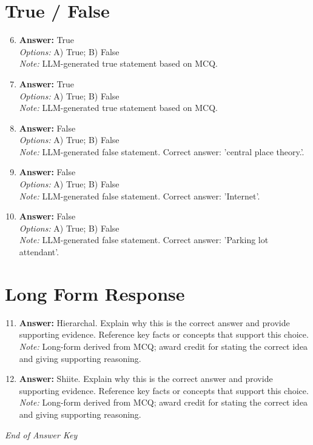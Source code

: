 \documentclass[12pt]{article}
\begin{document}
\section*{True / False}
\begin{enumerate}[label=\arabic*.]
\setcounter{enumi}{5}
\item \textbf{Answer:} True
\\ \textit{Options:} A) True; B) False
\\ \textit{Note:} LLM-generated true statement based on MCQ.
\item \textbf{Answer:} True
\\ \textit{Options:} A) True; B) False
\\ \textit{Note:} LLM-generated true statement based on MCQ.
\item \textbf{Answer:} False
\\ \textit{Options:} A) True; B) False
\\ \textit{Note:} LLM-generated false statement. Correct answer: 'central place theory.'.
\item \textbf{Answer:} False
\\ \textit{Options:} A) True; B) False
\\ \textit{Note:} LLM-generated false statement. Correct answer: 'Internet'.
\item \textbf{Answer:} False
\\ \textit{Options:} A) True; B) False
\\ \textit{Note:} LLM-generated false statement. Correct answer: 'Parking lot attendant'.
\end{enumerate}

\section*{Long Form Response}
\begin{enumerate}[label=\arabic*.]
\setcounter{enumi}{10}
\item \textbf{Answer:} Hierarchal. Explain why this is the correct answer and provide supporting evidence. Reference key facts or concepts that support this choice.
\\ \textit{Note:} Long-form derived from MCQ; award credit for stating the correct idea and giving supporting reasoning.
\item \textbf{Answer:} Shiite. Explain why this is the correct answer and provide supporting evidence. Reference key facts or concepts that support this choice.
\\ \textit{Note:} Long-form derived from MCQ; award credit for stating the correct idea and giving supporting reasoning.
\end{enumerate}

\vfill
\noindent\textit{End of Answer Key}
\end{document}
